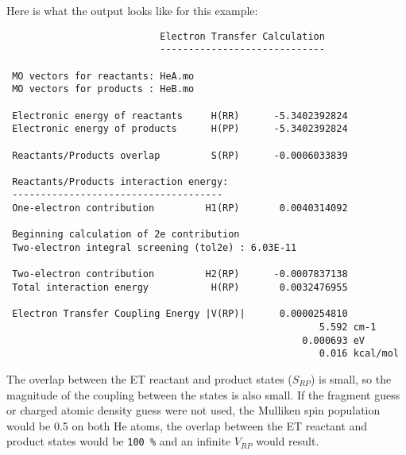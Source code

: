 Here is what the output looks like for this example:
\begin{verbatim}
                           Electron Transfer Calculation
                           -----------------------------

 MO vectors for reactants: HeA.mo
 MO vectors for products : HeB.mo

 Electronic energy of reactants     H(RR)      -5.3402392824
 Electronic energy of products      H(PP)      -5.3402392824

 Reactants/Products overlap         S(RP)      -0.0006033839

 Reactants/Products interaction energy:
 -------------------------------------
 One-electron contribution         H1(RP)       0.0040314092

 Beginning calculation of 2e contribution
 Two-electron integral screening (tol2e) : 6.03E-11

 Two-electron contribution         H2(RP)      -0.0007837138
 Total interaction energy           H(RP)       0.0032476955

 Electron Transfer Coupling Energy |V(RP)|      0.0000254810
                                                       5.592 cm-1
                                                    0.000693 eV
                                                       0.016 kcal/mol

\end{verbatim}

The overlap between the ET reactant and product states ($S_{RP}$) is small,
so the magnitude of the coupling between the states is also small. 
If the fragment guess
or charged atomic density guess were not used, the Mulliken spin population would be 0.5 on both He atoms, the overlap between
the ET reactant and product states would be \verb+100 %+ and an infinite
$V_{RP}$ would result.
